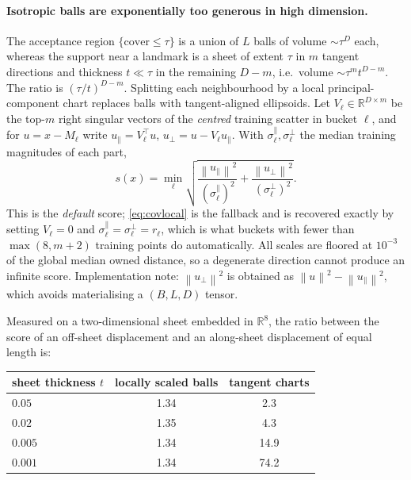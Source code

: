 \documentclass[12pt]{iopart}
\theoremstyle{definition}
\theoremstyle{plain}
\theoremstyle{remark}
\newcommand{\R}{\mathbb{R}}
\newcommand{\norm}[1]{\left\lVert#1\right\rVert}
\begin{document}
\paragraph{Isotropic balls are exponentially too generous in high dimension.}
The acceptance region $\{\mathrm{cover}\le\tau\}$ is a union of $L$ balls of
volume $\sim\tau^D$ each, whereas the support near a landmark is a sheet of
extent $\tau$ in $m$ tangent directions and thickness $t\ll\tau$ in the
remaining $D-m$, i.e.\ volume $\sim\tau^m t^{D-m}$. The ratio is
$(\tau/t)^{D-m}$. Splitting each neighbourhood by a local principal-component
chart replaces balls with tangent-aligned ellipsoids. Let $V_\ell\in\R^{D\times
m}$ be the top-$m$ right singular vectors of the \emph{centred} training
scatter in bucket $\ell$, and for $u=x-M_\ell$ write $u_\parallel=V_\ell^\top
u$, $u_\perp = u - V_\ell u_\parallel$. With $\sigma^\parallel_\ell,
\sigma^\perp_\ell$ the median training magnitudes of each part,
\begin{equation}
\label{eq:chartscore}
s(x)
=
\min_\ell
\sqrt{
\frac{\norm{u_\parallel}^2}{(\sigma^\parallel_\ell)^2}
+
\frac{\norm{u_\perp}^2}{(\sigma^\perp_\ell)^2}
} .
\end{equation}
This is the \emph{default} score; \eqref{eq:covlocal} is the fallback and is
recovered exactly by setting $V_\ell=0$ and
$\sigma^\parallel_\ell=\sigma^\perp_\ell=r_\ell$, which is what buckets with
fewer than $\max(8,m+2)$ training points do automatically. All scales are
floored at $10^{-3}$ of the global median owned distance, so a degenerate
direction cannot produce an infinite score. Implementation note: $\norm{u_\perp}^2$
is obtained as $\norm{u}^2-\norm{u_\parallel}^2$, which avoids materialising a
$(B,L,D)$ tensor.

Measured on a two-dimensional sheet embedded in $\R^8$, the ratio between the
score of an off-sheet displacement and an along-sheet displacement of equal
length is:

\begin{center}
\small
\begin{tabular}{lcc}
\toprule
sheet thickness $t$ & locally scaled balls & tangent charts \\
\midrule
$0.05$  & 1.34 & 2.3 \\
$0.02$  & 1.35 & 4.3 \\
$0.005$ & 1.34 & 14.9 \\
$0.001$ & 1.34 & 74.2 \\
\bottomrule
\end{tabular}
\end{center}
\end{document}
